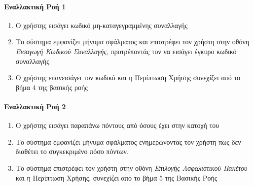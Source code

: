 \documentclass{../ol-softwaremanual}
\begin{document}
	\paragraph{Εναλλακτική Ροή 1 }
	
	\begin{enumerate}
		\item Ο χρήστης εισάγει κωδικό μη-καταγεγραμμένης συναλλαγής
		\item Το σύστημα εμφανίζει μήνυμα σφάλματος και επιστρέφει τον χρήστη στην  οθόνη \textit{Εισαγωγή Κωδικού Συναλλαγής}, προτρέποντάς τον να εισάγει έγκυρο κωδικό συναλλαγής
		\item Ο χρήστης επανεισάγει τον κωδικό και η Περίπτωση Χρήσης συνεχίζει από το βήμα 4 της βασικής ροής
	\end{enumerate}
	
	\paragraph{Εναλλακτική Ροή 2}
		\begin{enumerate}
			\item Ο χρήστης εισάγει παραπάνω πόντους από όσους έχει στην κατοχή του
			\item Το σύστημα εμφανίζει μήνυμα σφάλματος ενημερώνοντας τον χρήστη πως δεν διαθέτει το συγκεκριμένο πόσο πόντων.
			\item Το σύστημα επιστρέφει τον χρήστη στην οθόνη \textit{Επιλογής Ασφαλιστικού Πακέτου} και η Περίπτωση Χρήσης, συνεχίζει από το βήμα 5 της Βασικής Ροής
	\end{enumerate}
	
\end{document}
